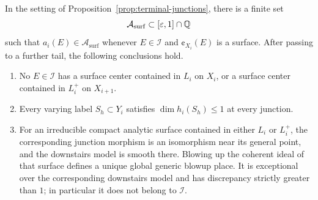 \begin{proposition}\label{prop:surface-finiteness}
In the setting of Proposition~\ref{prop:terminal-junctions}, there is a
finite set
\[
                    \mathcal A_{\mathrm{surf}}
                    \subset [\varepsilon,1]\cap\mathbb{Q}
\]
such that $a_i(E)\in\mathcal A_{\mathrm{surf}}$ whenever
$E\in\mathcal I$ and $\cent_{X_i}(E)$ is a surface.  After passing to a
further tail, the following conclusions hold.
\begin{enumerate}
\item No $E\in\mathcal I$ has a surface center contained in $L_i$ on
$X_i$, or a surface center contained in $L_i^+$ on $X_{i+1}$.
\item Every varying label $S_h\subset Y_i$ satisfies
$\dim h_i(S_h)\leq1$ at every junction.
\item For an irreducible compact analytic surface contained in either $L_i$
or $L_i^+$, the corresponding
junction morphism is an isomorphism near its general point, and the
downstairs model is smooth there.  Blowing up the coherent ideal of that
surface defines a unique global generic blowup place.  It is exceptional
over the corresponding downstairs model and has discrepancy strictly
greater than $1$; in particular it does not belong to $\mathcal I$.
\end{enumerate}
\end{proposition}

